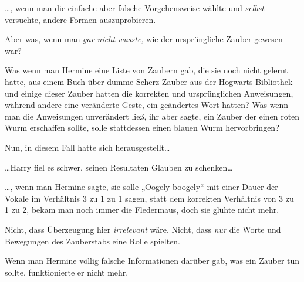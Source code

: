 …, wenn man die einfache aber falsche Vorgehensweise wählte und \emph{selbst} versuchte, andere Formen auszuprobieren.

Aber was, wenn man \emph{gar nicht wusste,} wie der ursprüngliche Zauber gewesen war?

Was wenn man Hermine eine Liste von Zaubern gab, die sie noch nicht gelernt hatte, aus einem Buch über dumme Scherz-Zauber aus der Hogwarts-Bibliothek und einige dieser Zauber hatten die korrekten und ursprünglichen Anweisungen, während andere eine veränderte Geste, ein geändertes Wort hatten? Was wenn man die Anweisungen unverändert ließ, ihr aber sagte, ein Zauber der einen roten Wurm erschaffen sollte, solle stattdessen einen blauen Wurm hervorbringen?

Nun, in diesem Fall hatte sich herausgestellt…

…Harry fiel es schwer, seinen Resultaten Glauben zu schenken…

…, wenn man Hermine sagte, sie solle „Oogely boogely“ mit einer Dauer der Vokale im Verhältnis 3 zu 1 zu 1 sagen, statt dem korrekten Verhältnis von 3 zu 1 zu 2, bekam man noch immer die Fledermaus, doch sie glühte nicht mehr.

Nicht, dass Überzeugung hier \emph{irrelevant} wäre. Nicht, dass \emph{nur} die Worte und Bewegungen des Zauberstabs eine Rolle spielten.

Wenn man Hermine völlig falsche Informationen darüber gab, was ein Zauber tun sollte, funktionierte er nicht mehr.

